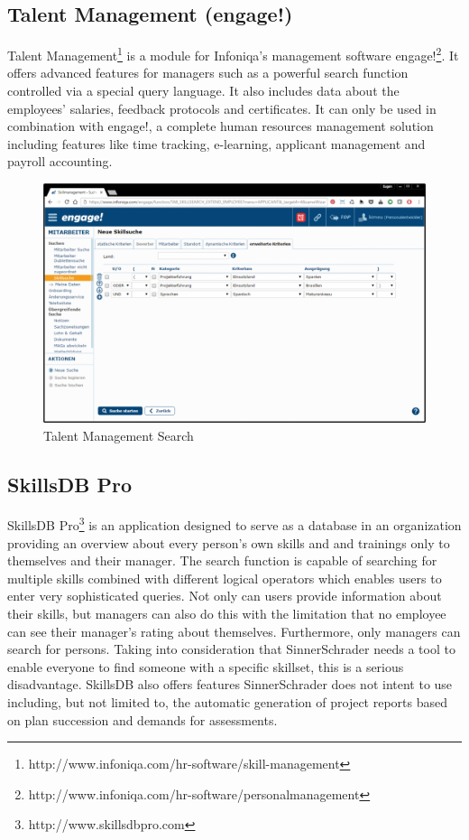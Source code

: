 \subsection{Talent Management (engage!)}
Talent Management\footnote{http://www.infoniqa.com/hr-software/skill-management} is a module for Infoniqa’s management software engage!\footnote{http://www.infoniqa.com/hr-software/personalmanagement}. It offers advanced features for managers such as a powerful search function controlled via a special query language. It also includes data about the employees’ salaries, feedback protocols and certificates. It can only be used in combination with engage!, a complete human resources management solution including features like time tracking, e-learning, applicant management and payroll accounting.

\begin{figure}[!htp]
    \centering
    \includegraphics[width=\textwidth]{images/talent_management_-_skillmanagement_-_skillsuche.png}
    \caption{Talent Management Search}
    \label{fig:talent_management}
\end{figure}

\subsection{SkillsDB Pro}
SkillsDB Pro\footnote{http://www.skillsdbpro.com} is an application designed to serve as a database in an organization providing an overview about every person’s own skills and and trainings only to themselves and their manager. The search function is capable of searching for multiple skills combined with different logical operators which enables users to enter very sophisticated queries.
Not only can users provide information about their skills, but managers can also do this with the limitation that no employee can see their manager’s rating about themselves.
Furthermore, only managers can search for persons. Taking into consideration that SinnerSchrader needs a tool to enable everyone to find someone with a specific skillset, this is a serious disadvantage.
SkillsDB also offers features SinnerSchrader does not intent to use including, but not limited to, the automatic generation of project reports based on plan succession and demands for assessments.

